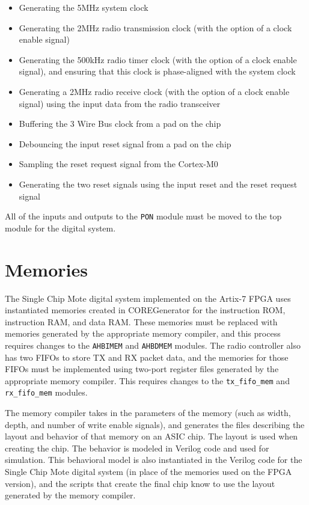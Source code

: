 \begin{itemize}
	\item Generating the 5MHz system clock
	\item Generating the 2MHz radio transmission clock (with the option of a clock enable signal)
	\item Generating the 500kHz radio timer clock (with the option of a clock enable signal), and ensuring that this clock is phase-aligned with the system clock
	\item Generating a 2MHz radio receive clock (with the option of a clock enable signal) using the input data from the radio transceiver
	\item Buffering the 3 Wire Bus clock from a pad on the chip
	\item Debouncing the input reset signal from a pad on the chip
	\item Sampling the reset request signal from the Cortex-M0
	\item Generating the two reset signals using the input reset and the reset request signal
\end{itemize}

All of the inputs and outputs to the \texttt{PON} module must be moved to the top module for the digital system.

\section{Memories}
The Single Chip Mote digital system implemented on the Artix-7 FPGA uses instantiated memories created in COREGenerator for the instruction ROM, instruction RAM, and data RAM. These memories must be replaced with memories generated by the appropriate memory compiler, and this process requires changes to the \texttt{AHBIMEM} and \texttt{AHBDMEM} modules. The radio controller also has two FIFOs to store TX and RX packet data, and the memories for those FIFOs must be implemented using two-port register files generated by the appropriate memory compiler. This requires changes to the \texttt{tx\_fifo\_mem} and \texttt{rx\_fifo\_mem} modules.

The memory compiler takes in the parameters of the memory (such as width, depth, and number of write enable signals), and generates the files describing the layout and behavior of that memory on an ASIC chip. The layout is used when creating the chip. The behavior is modeled in Verilog code and used for simulation. This behavioral model is also instantiated in the Verilog code for the Single Chip Mote digital system (in place of the memories used on the FPGA version), and the scripts that create the final chip know to use the layout generated by the memory compiler.

